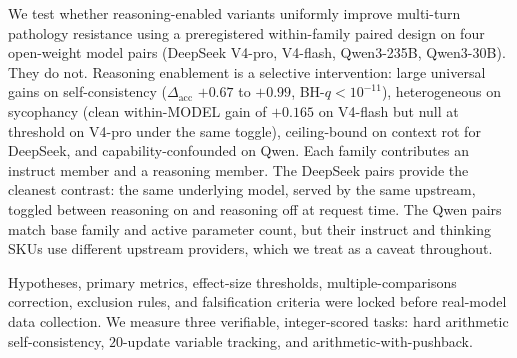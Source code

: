We test whether reasoning-enabled variants uniformly improve multi-turn
pathology resistance using a preregistered within-family paired design
on four open-weight model pairs (DeepSeek V4-pro, V4-flash,
Qwen3-235B, Qwen3-30B). They do not. Reasoning enablement is a
selective intervention: large universal gains on self-consistency
($\Delta_{\mathrm{acc}}$ $+0.67$ to $+0.99$, BH-$q < 10^{-11}$),
heterogeneous on sycophancy (clean within-MODEL gain of $+0.165$ on
V4-flash but null at threshold on V4-pro under the same toggle),
ceiling-bound on context rot for DeepSeek, and capability-confounded on
Qwen. Each family contributes an instruct member and a reasoning member.
The DeepSeek pairs provide the cleanest contrast: the same underlying
model, served by the same upstream, toggled between reasoning on and
reasoning off at request time. The Qwen pairs match base family and
active parameter count, but their instruct and thinking SKUs use
different upstream providers, which we treat as a caveat throughout.

Hypotheses, primary metrics, effect-size thresholds, multiple-comparisons
correction, exclusion rules, and falsification criteria were locked before
real-model data collection. We measure three verifiable, integer-scored
tasks: hard arithmetic self-consistency, $20$-update variable tracking,
and arithmetic-with-pushback.
